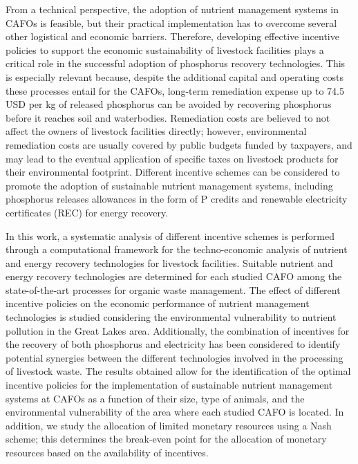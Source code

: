 \begin{refsection}[referencesCh5]
From a technical perspective, the adoption of nutrient management systems in CAFOs is feasible, but their practical implementation has to overcome several other logistical  and economic barriers.
Therefore, developing effective incentive policies to support the economic sustainability of livestock facilities plays a critical role in the successful adoption of phosphorus recovery technologies.
This is especially relevant because, despite the additional capital and operating costs these processes entail for the CAFOs, long-term remediation expense up to 74.5 USD per kg of released phosphorus \citep{Sampat2020} can be avoided by recovering phosphorus before it reaches soil and waterbodies. Remediation costs are believed to not affect the owners of livestock facilities directly; however, environmental remediation costs are usually covered by public budgets funded by taxpayers, and may lead to the eventual application of specific taxes on livestock products for their environmental footprint. Different incentive schemes can be considered to promote the adoption of sustainable nutrient management systems, including phosphorus releases allowances in the form of P credits and renewable electricity certificates (REC) for energy recovery.

In this work, a systematic analysis of different incentive schemes is performed through a computational framework for the techno-economic analysis of nutrient and energy recovery technologies for livestock facilities. Suitable nutrient and energy recovery technologies are determined for each studied CAFO among the state-of-the-art processes for organic waste management. The effect of different incentive policies on the economic performance of nutrient management technologies is studied considering the environmental vulnerability to nutrient pollution in the Great Lakes area. Additionally, the combination of incentives for the recovery of both phosphorus and electricity has been considered to identify potential synergies between the different technologies involved in the processing of livestock waste. The results obtained allow for the identification of the optimal incentive policies for the implementation of sustainable nutrient management systems at CAFOs as a function of their size, type of animals, and the environmental vulnerability of the area where each studied CAFO is located.  In addition, we study the allocation of limited monetary resources  using a Nash scheme; this determines the break-even point for the allocation of monetary resources  based on the availability of incentives.


\end{refsection}
